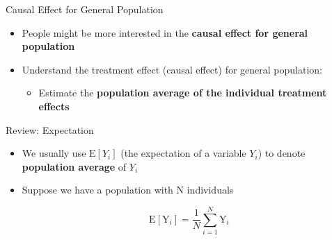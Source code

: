 \documentclass[hyperref={pdfpagelabels=false}]{beamer}
\begin{document}
\begin{frame}{}
	\titlepage
\end{frame}




\begin{frame}{Causal Effect for General Population}
\begin{itemize}
\item People might be more interested in the \textbf{causal effect for general population}
\vspace{0.2cm}	
\vspace{0.2cm}
\item Understand the treatment effect (causal effect) for general population: 
\vspace{0.2cm}
\begin{itemize}
\item Estimate the \textbf{population average of the individual treatment effects} 
\end{itemize}

\end{itemize}
\end{frame}



\begin{frame}{Review: Expectation}
\begin{itemize} 
\item We usually use $\mathrm{E}[Y_{i}]$ (the expectation of a variable $Y_{i}$) to denote \textbf{population average} of $Y_{i}$ 

\item Suppose we have a population with N individuals

\begin{equation*}
\mathrm{E}[\mathrm{Y}_{i}] = \dfrac{1}{N} \sum^N_{i=1} \mathrm{Y}_{i}
\end{equation*}

\vspace{0.2cm}

\end{itemize}
\end{frame}
\end{document}
